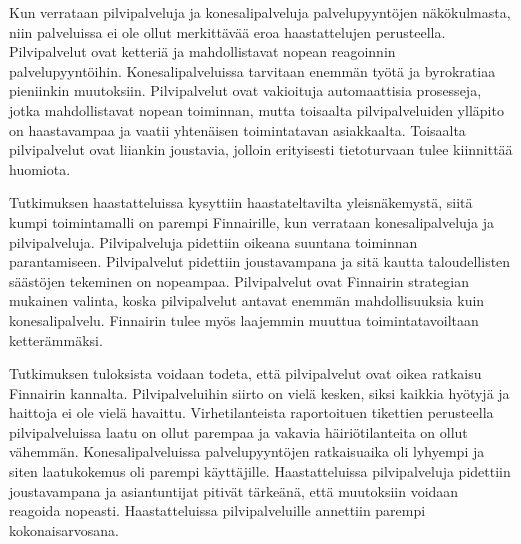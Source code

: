 Kun verrataan pilvipalveluja ja konesalipalveluja palvelupyyntöjen näkökulmasta, niin palveluissa ei ole ollut merkittävää eroa haastattelujen perusteella. Pilvipalvelut ovat ketteriä ja mahdollistavat nopean reagoinnin palvelupyyntöihin. Konesalipalveluissa tarvitaan enemmän työtä ja byrokratiaa pieniinkin muutoksiin. Pilvipalvelut ovat vakioituja automaattisia prosesseja, jotka mahdollistavat nopean toiminnan, mutta toisaalta pilvipalveluiden ylläpito on haastavampaa ja vaatii yhtenäisen toimintatavan asiakkaalta. Toisaalta pilvipalvelut ovat liiankin joustavia, jolloin erityisesti tietoturvaan tulee kiinnittää huomiota.

Tutkimuksen haastatteluissa kysyttiin haastateltavilta yleisnäkemystä, siitä kumpi toimintamalli on parempi Finnairille, kun verrataan konesalipalveluja ja pilvipalveluja.  Pilvipalveluja pidettiin oikeana suuntana toiminnan parantamiseen. Pilvipalvelut pidettiin joustavampana ja sitä kautta taloudellisten säästöjen tekeminen on nopeampaa. Pilvipalvelut ovat Finnairin strategian mukainen valinta, koska pilvipalvelut antavat enemmän mahdollisuuksia kuin konesalipalvelu. Finnairin tulee myös laajemmin muuttua toimintatavoiltaan ketterämmäksi.

Tutkimuksen tuloksista voidaan todeta, että pilvipalvelut ovat oikea ratkaisu Finnairin kannalta. Pilvipalveluihin siirto on vielä kesken, siksi kaikkia hyötyjä ja haittoja ei ole vielä havaittu. Virhetilanteista raportoituen tikettien perusteella pilvipalveluissa laatu on ollut parempaa ja vakavia häiriötilanteita on ollut vähemmän. Konesalipalveluissa palvelupyyntöjen ratkaisuaika oli lyhyempi ja siten laatukokemus oli parempi käyttäjille. Haastatteluissa pilvipalveluja pidettiin joustavampana ja asiantuntijat pitivät tärkeänä, että muutoksiin voidaan reagoida nopeasti. Haastatteluissa pilvipalveluille annettiin parempi kokonaisarvosana. 


